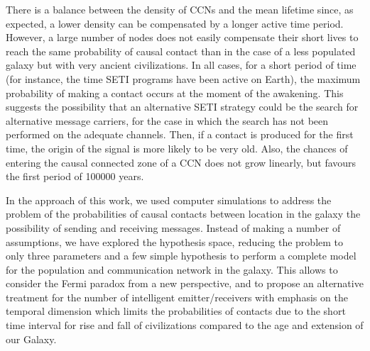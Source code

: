 \documentclass[crop]{CSLB}
\newcommand{\ceti}{CCN}
\newcommand{\cetis}{CCNs}
\begin{document}

There is a balance between the density of \cetis{} and the mean
lifetime since, as expected, a lower density can be compensated by a
longer active time period.
%
However, a large number of nodes does not easily compensate their
short lives to reach the same probability of causal contact than in
the case of a less populated galaxy but with very ancient
civilizations.
%
In all cases, for a short period of time (for instance, the time SETI
programs have been active on Earth), the maximum probability of making
a contact occurs at the moment of the awakening.
%
This suggests the possibility that an alternative SETI strategy could
be the search for alternative message carriers, for the case in which
the search has not been performed on the adequate channels.
%
Then, if a contact is produced for the first time, the origin of the
signal is more likely to be very old.
%
Also, the chances of entering the causal connected zone of a \ceti{}
does not grow linearly, but favours the first period of 100000 years.






In the approach of this work, we used computer simulations to address
the problem of the probabilities of causal contacts between location
in the galaxy the possibility of sending and receiving messages.
%
Instead of making a number of assumptions, we have explored the
hypothesis space, reducing the problem to only three parameters and a
few simple hypothesis to perform a complete model for the population and
communication network in the galaxy.
%
This allows to consider the Fermi paradox from a new perspective, and
to propose an alternative treatment for the number of intelligent
emitter/receivers with emphasis on the temporal dimension which limits
the probabilities of contacts due to the short time interval for
rise and fall of civilizations compared to the age and extension of
our Galaxy.




\end{document}
